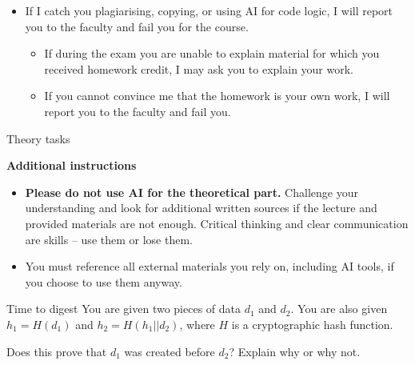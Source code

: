 \documentclass{homework}
\begin{document}
\begin{itemize}
\begin{itemize}
    \item Not acceptable: e.g. generating code logic, library use, or crypto operations.
    \item If you use AI in any form, including for rewording, state in your report where and what you used it for.
    \item I recommend asking in the server or contacting me instead of using AI.
  \end{itemize}
  \item If I catch you plagiarising, copying, or using AI for code logic, I will report you to the faculty and fail you for the course.
  \begin{itemize}
    \item If during the exam you are unable to explain material for which you received homework credit, I may ask you to explain your work.
    \item If you cannot convince me that the homework is your own work, I will report you to the faculty and fail you.
  \end{itemize}
\end{itemize}

\newpage

\begin{center}
  Theory tasks
\end{center}

\textbf{Additional instructions}

\begin{itemize}
  \item \textbf{Please do not use AI for the theoretical part.}
  Challenge your understanding and look for additional written sources if the lecture and provided materials are not enough.
  Critical thinking and clear communication are skills -- use them or lose them.
  \item You must reference all external materials you rely on, including AI tools, if you choose to use them anyway.
\end{itemize}

\begin{task}{Time to digest}
  You are given two pieces of data $d_1$ and $d_2$.
  You are also given $h_1 = H(d_1)$ and $h_2 = H(h_1||d_2)$, where $H$ is a cryptographic hash function.

  Does this prove that $d_1$ was created before $d_2$?
  Explain why or why not.
\end{task}
\end{document}
